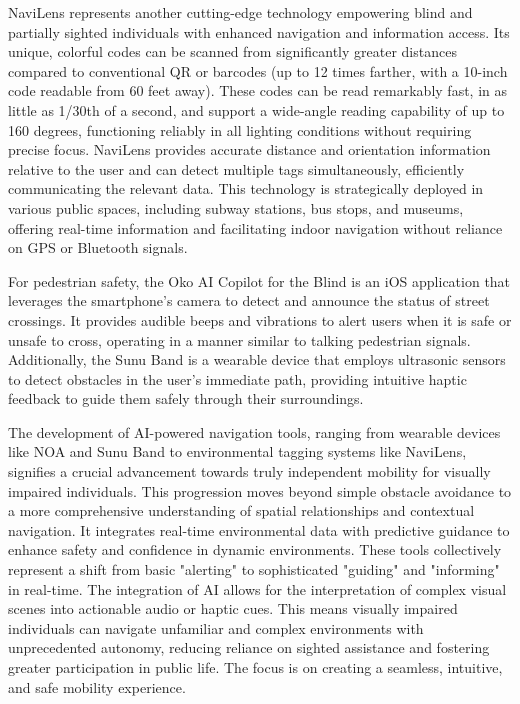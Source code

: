NaviLens represents another cutting-edge technology empowering blind and partially sighted individuals with enhanced navigation and information access. Its unique, colorful codes can be scanned from significantly greater distances compared to conventional QR or barcodes (up to 12 times farther, with a 10-inch code readable from 60 feet away). These codes can be read remarkably fast, in as little as 1/30th of a second, and support a wide-angle reading capability of up to 160 degrees, functioning reliably in all lighting conditions without requiring precise focus. NaviLens provides accurate distance and orientation information relative to the user and can detect multiple tags simultaneously, efficiently communicating the relevant data. This technology is strategically deployed in various public spaces, including subway stations, bus stops, and museums, offering real-time information and facilitating indoor navigation without reliance on GPS or Bluetooth signals. \cite{navilens}

For pedestrian safety, the Oko AI Copilot for the Blind is an iOS application that leverages the smartphone's camera to detect and announce the status of street crossings. It provides audible beeps and vibrations to alert users when it is safe or unsafe to cross, operating in a manner similar to talking pedestrian signals. \cite{accessiblepharmacy2024} Additionally, the Sunu Band is a wearable device that employs ultrasonic sensors to detect obstacles in the user's immediate path, providing intuitive haptic feedback to guide them safely through their surroundings. \cite{arxiv2503}

The development of AI-powered navigation tools, ranging from wearable devices like NOA and Sunu Band to environmental tagging systems like NaviLens, signifies a crucial advancement towards truly independent mobility for visually impaired individuals. This progression moves beyond simple obstacle avoidance to a more comprehensive understanding of spatial relationships and contextual navigation. It integrates real-time environmental data with predictive guidance to enhance safety and confidence in dynamic environments. These tools collectively represent a shift from basic "alerting" to sophisticated "guiding" and "informing" in real-time. The integration of AI allows for the interpretation of complex visual scenes into actionable audio or haptic cues. This means visually impaired individuals can navigate unfamiliar and complex environments with unprecedented autonomy, reducing reliance on sighted assistance and fostering greater participation in public life. The focus is on creating a seamless, intuitive, and safe mobility experience.

